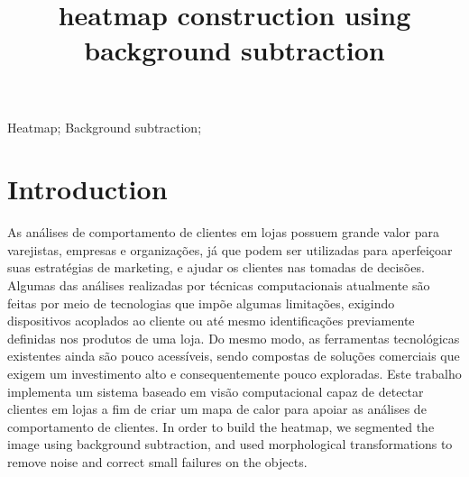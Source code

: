 \documentclass[10pt, conference]{IEEEtran}
\begin{document}
\title{heatmap construction using background subtraction}

\newif\iffinal
\finaltrue
\newcommand{\jemsid}{99999}
\iffinal
	\author{%
	    \and
	}
\else
  \author{Sibgrapi paper ID: \jemsid \\ }
\fi

\maketitle

\begin{abstract}
\end{abstract}

\begin{IEEEkeywords}
Heatmap; Background subtraction;

\end{IEEEkeywords}

\IEEEpeerreviewmaketitle

\section{Introduction}
As análises de comportamento de clientes em lojas possuem grande valor para varejistas, empresas e organizações, já que podem ser utilizadas para aperfeiçoar suas estratégias de marketing, e ajudar os clientes nas tomadas de decisões. Algumas das análises realizadas por técnicas computacionais atualmente são feitas por meio de tecnologias que impõe algumas limitações, exigindo dispositivos acoplados ao cliente ou até mesmo identificações previamente definidas nos produtos de uma loja. Do mesmo modo, as ferramentas tecnológicas existentes ainda são pouco acessíveis, sendo compostas de soluções comerciais que exigem um investimento alto e consequentemente pouco exploradas.
Este trabalho implementa um sistema baseado em visão computacional capaz de detectar clientes em lojas a fim de criar um mapa de calor para apoiar as análises de comportamento de clientes. In order to build the heatmap, we segmented the image using background subtraction, and used morphological transformations to remove noise and correct small failures on the objects.
\end{document}
